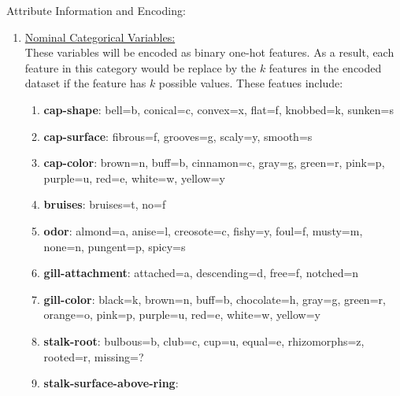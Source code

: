 \documentclass[fleqn]{article}
\begin{document}
    Attribute Information and Encoding:
    \begin{enumerate}
        \item \underline{Nominal Categorical Variables:}\\
        These variables will be encoded as binary one-hot features. As a result, each feature
        in this category would be replace by the $ k $ features in the encoded dataset if the
        feature has $ k $ possible values. These featues include:
        \begin{enumerate}[label=\roman*.]
            \item \textbf{cap-shape}:
                bell=b,
                conical=c,
                convex=x,
                flat=f,
                knobbed=k,
                sunken=s
            \item \textbf{cap-surface}:
                fibrous=f,
                grooves=g,
                scaly=y,
                smooth=s
            \item \textbf{cap-color}:
                brown=n,
                buff=b,
                cinnamon=c,
                gray=g,
                green=r,
                pink=p,
                purple=u,
                red=e,
                white=w,
                yellow=y
            \item \textbf{bruises}:
                bruises=t,
                no=f
            \item \textbf{odor}:
                almond=a,
                anise=l,
                creosote=c,
                fishy=y,
                foul=f,
                musty=m,
                none=n,
                pungent=p,
                spicy=s
            \item \textbf{gill-attachment}:
                attached=a,
                descending=d,
                free=f,
                notched=n
            \item \textbf{gill-color}:
                black=k,
                brown=n,
                buff=b,
                chocolate=h,
                gray=g,
                green=r,
                orange=o,
                pink=p,
                purple=u,
                red=e,
                white=w,
                yellow=y
            \item \textbf{stalk-root}:
                bulbous=b,
                club=c,
                cup=u,
                equal=e,
                rhizomorphs=z,
                rooted=r,
                missing=?
            \item \textbf{stalk-surface-above-ring}:

\end{enumerate}
\end{enumerate}
\end{document}
